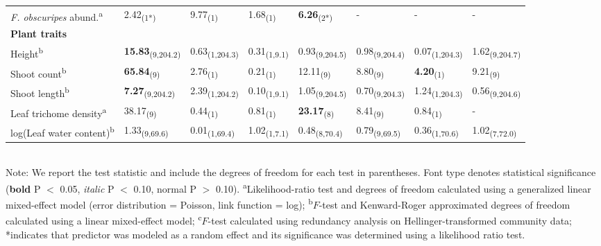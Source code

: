 \documentclass[11pt]{article}
\begin{document}
\begin{table}
\begin{tabular}{@{}llllllll@{}}
\textit{F. obscuripes} abund.\textsuperscript{a}     & 2.42\textsubscript{(1*)}       & 9.77\textsubscript{(1)}       & 1.68\textsubscript{(1)}     & \textbf{6.26}\textsubscript{(2*)}      & -             & -             & -             \\
\textbf{Plant traits}             &                &               &             &               &               &               &               \\
Height\textsuperscript{b}                  & \textbf{15.83}\textsubscript{(9,204.2)} & 0.63\textsubscript{(1,204.3)} & 0.31\textsubscript{(1,9.1)} & 0.93\textsubscript{(9,204.5)} & 0.98\textsubscript{(9,204.4)} & 0.07\textsubscript{(1,204.3)} & 1.62\textsubscript{(9,204.7)} \\
Shoot count\textsuperscript{b}             & \textbf{65.84}\textsubscript{(9)}       & 2.76\textsubscript{(1)}       & 0.21\textsubscript{(1)}     & 12.11\textsubscript{(9)}      & 8.80\textsubscript{(9)}       & \textbf{4.20}\textsubscript{(1)}       & 9.21\textsubscript{(9)}       \\
Shoot length\textsuperscript{b}            & \textbf{7.27}\textsubscript{(9,204.2)}  & 2.39\textsubscript{(1,204.2)} & 0.10\textsubscript{(1,9.1)} & 1.05\textsubscript{(9,204.5)} & 0.70\textsubscript{(9,204.3)} & 1.24\textsubscript{(1,204.3)} & 0.56\textsubscript{(9,204.6)} \\
Leaf trichome density\textsuperscript{a}   & 38.17\textsubscript{(9)}       & 0.44\textsubscript{(1)}       & 0.81\textsubscript{(1)}     & \textbf{23.17}\textsubscript{(8)}      & 8.41\textsubscript{(9)}       & 0.84\textsubscript{(1)}       & -             \\
log(Leaf water content)\textsuperscript{b} & 1.33\textsubscript{(9,69.6)}   & 0.01\textsubscript{(1,69.4)}  & 1.02\textsubscript{(1,7.1)} & 0.48\textsubscript{(8,70.4)}  & 0.79\textsubscript{(9,69.5)}  & 0.36\textsubscript{(1,70.6)}  & 1.02\textsubscript{(7,72.0)}  \\ \bottomrule
\end{tabular}
\bigskip{}
\\
{\footnotesize Note: We report the test statistic and include the degrees of freedom for each test in parentheses. Font type denotes statistical significance (\textbf{bold} P $<$ 0.05, \textit{italic} P $<$ 0.10, normal P $>$ 0.10). \textsuperscript{a}Likelihood-ratio test and degrees of freedom calculated using a generalized linear mixed-effect model (error distribution = Poisson, link function = log); \textsuperscript{b}$F$-test and Kenward-Roger approximated degrees of freedom calculated using a linear mixed-effect model; \textsuperscript{c}$F$-test calculated using redundancy analysis on Hellinger-transformed community data; *indicates that predictor was modeled as a random effect and its significance was determined using a likelihood ratio test.}
\end{table}
\end{document}

